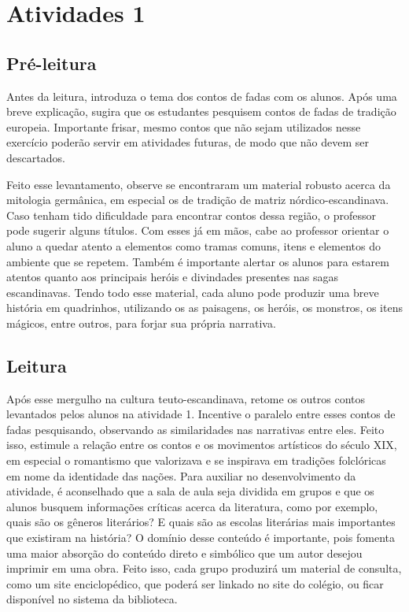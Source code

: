 \documentclass{extarticle}
\begin{document}
\section{Atividades 1}


\subsection{Pré-leitura}


Antes da leitura, introduza o tema dos contos de fadas com
os alunos. Após uma breve explicação, sugira que os estudantes pesquisem
contos de fadas de tradição europeia. Importante frisar, mesmo contos
que não sejam utilizados nesse exercício poderão servir em atividades
futuras, de modo que não devem ser descartados.

Feito esse levantamento, observe se encontraram um material robusto
acerca da mitologia germânica, em especial os de tradição de matriz
nórdico-escandinava. Caso tenham tido dificuldade para encontrar contos
dessa região, o professor pode sugerir alguns títulos. Com esses já em
mãos, cabe ao professor orientar o aluno a quedar atento a elementos
como tramas comuns, itens e elementos do ambiente que se repetem. Também
é importante alertar os alunos para estarem atentos quanto aos
principais heróis e divindades presentes nas sagas escandinavas. Tendo
todo esse material, cada aluno pode produzir uma breve história em
quadrinhos, utilizando os as paisagens, os heróis, os monstros, os itens
mágicos, entre outros, para forjar sua própria narrativa.

\subsection{Leitura}


Após esse mergulho na cultura teuto-escandinava, retome os
outros contos levantados pelos alunos na atividade 1. Incentive o
paralelo entre esses contos de fadas pesquisando, observando as
similaridades nas narrativas entre eles. Feito isso, estimule a relação
entre os contos e os movimentos artísticos do século XIX, em especial o
romantismo que valorizava e se inspirava em tradições folclóricas em
nome da identidade das nações. Para auxiliar no desenvolvimento da
atividade, é aconselhado que a sala de aula seja dividida em grupos e
que os alunos busquem informações críticas acerca da literatura, como
por exemplo, quais são os gêneros literários? E quais são as escolas
literárias mais importantes que existiram na história? O domínio desse
conteúdo é importante, pois fomenta uma maior absorção do conteúdo
direto e simbólico que um autor desejou imprimir em uma obra. Feito
isso, cada grupo produzirá um material de consulta, como um site
enciclopédico, que poderá ser linkado no site do colégio, ou ficar
disponível no sistema da biblioteca.
\end{document}
